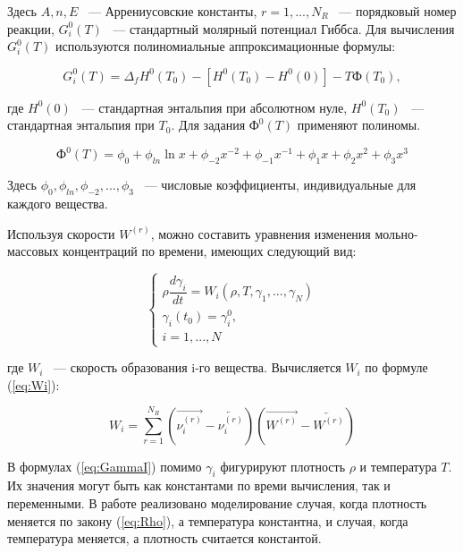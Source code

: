 Здесь $A, n, E$ ~--- Аррениусовские константы, $r = 1, ..., N_R$ ~--- порядковый номер реакции, $G_i^0(T)$ ~--- стандартный молярный потенциал
Гиббса. Для вычисления $G_i^0(T)$ используются полиномиальные аппроксимационные формулы:

\begin{equation}
    G_i^0(T) = \Delta_fH^0(T_0) - [H^0(T_0) - H^0(0)] - T\text{Ф}(T_0),
    \label{eq:Gi}
\end{equation}

где $H^0(0)$ ~--- стандартная энтальпия при абсолютном нуле, $H^0(T_0)$ ~--- стандартная энтальпия при $T_0$. Для задания $\text{Ф}^0(T)$
применяют полиномы.

\begin{equation}
    \text{Ф}^0(T) = \phi_0 + \phi_{ln}\ln x + \phi_{-2}x^{-2} + \phi_{-1}x^{-1} + \phi_{1}x + \phi_{2}x^{2} + \phi_{3}x^{3}
    \label{eq:F_i}
\end{equation}

Здесь $\phi_0, \phi_{ln}, \phi_{-2}, ..., \phi_3$ ~--- числовые коэффициенты, индивидуальные для каждого вещества.

Используя скорости $W^{(r)}$, можно составить уравнения изменения мольно-массовых концентраций по времени,
имеющих следующий вид:

\begin{equation}
    \begin{cases}
        \rho \dfrac{d\gamma_i}{dt} = W_i(\rho, T, \gamma_1, ..., \gamma_N)\\
        \gamma_i(t_0) = \gamma_i^0,\\
        i = 1, ..., N
    \end{cases}
    \label{eq:GammaI}
\end{equation}

где $W_i$ ~--- скорость образования i-го вещества. Вычисляется $W_i$ по формуле (\ref{eq:Wi}):

\begin{equation}
    W_i = \sum\limits_{r = 1}^{N_R}(\overrightarrow{\nu_i^{(r)}} - \overleftarrow{\nu_i^{(r)}})(\overrightarrow{W^{(r)}} - \overleftarrow{W^{(r)}})
    \label{eq:Wi}
\end{equation}

В формулах (\ref{eq:GammaI}) помимо $\gamma_i$ фигурируют плотность $\rho$ и температура $T$. Их значения могут быть как константами по
времи вычисления, так и переменными. В работе реализовано моделирование случая, когда плотность меняется по закону 
(\ref{eq:Rho}), а температура константна, и случая, когда температура меняется, а плотность считается константой.

